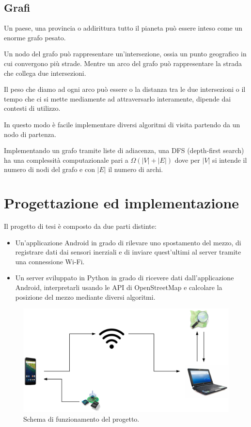 \documentclass[12pt,a4paper,openright,twoside]{report}
\begin{document}
\section{Grafi}
Un paese, una provincia o addirittura tutto il pianeta può essere inteso come un enorme grafo pesato.

Un nodo del grafo può rappresentare un'intersezione, ossia un punto geografico in cui convergono più strade. Mentre un arco del grafo può rappresentare la strada che collega due intersezioni.
 
Il peso che diamo ad ogni arco può essere o la distanza tra le due intersezioni o il tempo che ci si mette mediamente ad attraversarlo interamente, dipende dai contesti di utilizzo.

In questo modo è facile implementare diversi algoritmi di visita partendo da un nodo di partenza.

Implementando un grafo tramite liste di adiacenza, una DFS (depth-first search) ha una complessità computazionale pari a $\Omega(|V| + |E|) $ dove per $\left|V \right|$ si intende il numero di nodi del grafo e con $\left| E \right|$ il numero di archi.

\clearpage{\pagestyle{empty}\cleardoublepage}
\chapter{Progettazione ed implementazione}                %
\lhead[\fancyplain{}{\bfseries\thepage}]{\fancyplain{}{\bfseries\rightmark}}
Il progetto di tesi è composto da due parti distinte:

\begin{itemize}
\item Un'applicazione Android in grado di rilevare uno spostamento del mezzo, di registrare dati dai sensori inerziali e di inviare quest'ultimi al server tramite una connessione Wi-Fi.
\item Un server sviluppato in Python in grado di ricevere dati dall'applicazione Android, interpretarli usando le API di OpenStreetMap e calcolare la posizione del mezzo mediante diversi algoritmi.
\end{itemize}

\begin{figure}[h]
\centering 
\includegraphics[scale=0.4]{fig10} 
\caption{Schema di funzionamento del progetto.} 
\end{figure}
\newpage
\end{document}
